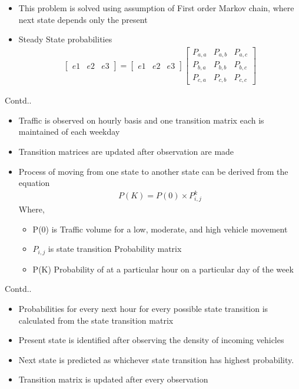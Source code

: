 \documentclass[10pt]{beamer}
\begin{document}
\begin{frame}
\begin{itemize}
\item This problem is solved using assumption of First order Markov chain, where next state 
depends only the present 
\item{Steady State probabilities}
\begin{align*}
\begin{bmatrix} e1 & e2 & e3 \end{bmatrix} 
= 
\begin{bmatrix} e1 & e2 & e3 \end{bmatrix} \begin{bmatrix}
    P_{a,a}  &  P_{a,b} &  P_{a,c} \\
    P_{b,a}  &  P_{b,b} &  P_{b,c} \\
    P_{c,a}  &  P_{c,b} &  P_{c,c}
\end{bmatrix}
\end{align*}
\end{itemize}
\end{frame}

\begin{frame}{Contd..}
\begin{itemize} 
\item  Traffic is observed on hourly basis and one transition matrix each is maintained of each weekday
\item Transition matrices are updated after observation are made
\item Process of moving from one state to another state can be derived from the equation
\begin{align*}
    P(K) = P(0) \times P_{i,j}^k
\end{align*}
Where,
\begin{itemize}
\item P(0) is Traffic volume for a low, moderate, and high vehicle movement
\item $P_{i,j}$ is state transition Probability matrix
\item P(K) Probability of at a particular hour on a particular day of the week
\end{itemize}
\end{itemize}
\end{frame}

\begin{frame}{Contd..}
\begin{itemize}
\item Probabilities for every next hour for every possible state transition is calculated from 
the state transition matrix
\item Present state is identified after observing the density of incoming vehicles
\item Next state is predicted as whichever state transition has highest probability.
\item Transition matrix is updated after every observation 
\end{itemize}
\end{frame}
\end{document}
